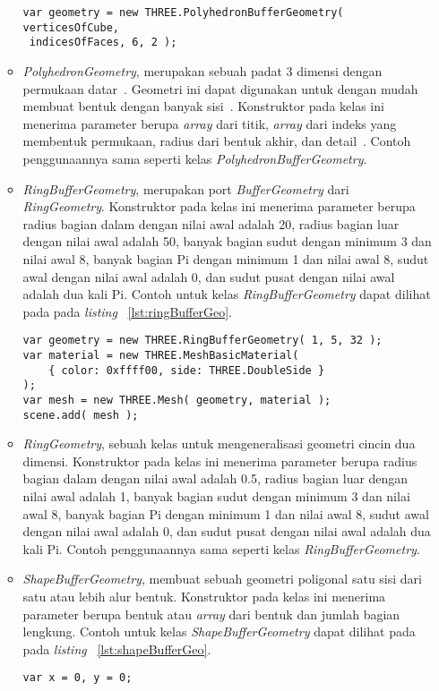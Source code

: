 \begin{itemize}
\begin{itemize}
\begin{lstlisting}[caption={Contoh penggunaan kelas {\it PolyhedronBufferGeometry}.}, label={lst:polyhedronBufferGeo},captionpos=b]
var geometry = new THREE.PolyhedronBufferGeometry( verticesOfCube,
 indicesOfFaces, 6, 2 );
\end{lstlisting}
		\item {\it PolyhedronGeometry}, merupakan sebuah padat 3 dimensi dengan permukaan datar~\cite{threejs}. Geometri ini dapat digunakan untuk dengan mudah membuat bentuk dengan banyak sisi~\cite{learningThreejs}. Konstruktor pada kelas ini menerima parameter berupa {\it array} dari titik, {\it array} dari indeks yang membentuk permukaan, radius dari bentuk akhir, dan detail~\cite{threejs}. Contoh penggunaannya sama seperti kelas {\it PolyhedronBufferGeometry}.
		\item {\it RingBufferGeometry}, merupakan port {\it BufferGeometry} dari {\it RingGeometry}. Konstruktor pada kelas ini menerima parameter berupa radius bagian dalam dengan nilai awal adalah 20, radius bagian luar dengan nilai awal adalah 50, banyak bagian sudut dengan minimum 3 dan nilai awal 8, banyak bagian Pi dengan minimum 1 dan nilai awal 8, sudut awal dengan nilai awal adalah 0, dan sudut pusat dengan nilai awal adalah dua kali Pi. Contoh untuk kelas {\it RingBufferGeometry} dapat dilihat pada pada {\it listing} ~\ref{lst:ringBufferGeo}.
\begin{lstlisting}[caption={Contoh penggunaan kelas {\it RingBufferGeometry}.}, label={lst:ringBufferGeo},captionpos=b]
var geometry = new THREE.RingBufferGeometry( 1, 5, 32 );
var material = new THREE.MeshBasicMaterial( 
	{ color: 0xffff00, side: THREE.DoubleSide } 
);
var mesh = new THREE.Mesh( geometry, material );
scene.add( mesh );
\end{lstlisting}
		\item {\it RingGeometry}, sebuah kelas untuk mengeneralisasi geometri cincin dua dimensi. Konstruktor pada kelas ini menerima parameter berupa radius bagian dalam dengan nilai awal adalah 0.5, radius bagian luar dengan nilai awal adalah 1, banyak bagian sudut dengan minimum 3 dan nilai awal 8, banyak bagian Pi dengan minimum 1 dan nilai awal 8, sudut awal dengan nilai awal adalah 0, dan sudut pusat dengan nilai awal adalah dua kali Pi.  Contoh penggunaannya sama seperti kelas {\it RingBufferGeometry}.
		\item {\it ShapeBufferGeometry}, membuat sebuah geometri poligonal satu sisi dari satu atau lebih alur bentuk. Konstruktor pada kelas ini menerima parameter berupa bentuk atau {\it array} dari bentuk dan jumlah bagian lengkung. Contoh untuk kelas {\it ShapeBufferGeometry} dapat dilihat pada pada {\it listing} ~\ref{lst:shapeBufferGeo}.
\begin{lstlisting}[caption={Contoh penggunaan kelas {\it ShapeBufferGeometry}.}, label={lst:shapeBufferGeo},captionpos=b]
var x = 0, y = 0;


\end{lstlisting}
\end{itemize}
\end{itemize}
